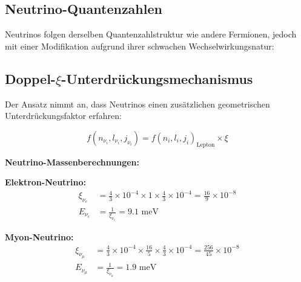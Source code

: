 \subsection{Neutrino-Quantenzahlen}
\label{subsec:neutrino_quantum_numbers}

Neutrinos folgen derselben Quantenzahlstruktur wie andere Fermionen, jedoch mit einer Modifikation aufgrund ihrer schwachen Wechselwirkungsnatur:

\begin{table}[H]
	\centering
	\caption{Neutrino-Quantenzahlen mit charakteristischer Doppel-$\xi$-Unterdrückung}
	\label{tab:neutrino_quantum_numbers}
\end{table}

\subsection{Doppel-$\xi$-Unterdrückungsmechanismus}
\label{subsec:double_xi_suppression}

Der Ansatz nimmt an, dass Neutrinos einen zusätzlichen geometrischen Unterdrückungsfaktor erfahren:

\begin{equation}
	f(n_{\nu_i}, l_{\nu_i}, j_{\nu_i}) = f(n_i, l_i, j_i)_{\text{Lepton}} \times \xi
	\label{eq:neutrino_suppression}
\end{equation}

\textbf{Neutrino-Massenberechnungen:}

\textbf{Elektron-Neutrino:}
\begin{align}
	\xi_{\nu_e} &= \frac{4}{3} \times 10^{-4} \times 1 \times \frac{4}{3} \times 10^{-4} = \frac{16}{9} \times 10^{-8} \\
	E_{\nu_e} &= \frac{1}{\xi_{\nu_e}} = 9.1 \text{ meV}
\end{align}

\textbf{Myon-Neutrino:}
\begin{align}
	\xi_{\nu_\mu} &= \frac{4}{3} \times 10^{-4} \times \frac{16}{5} \times \frac{4}{3} \times 10^{-4} = \frac{256}{45} \times 10^{-8} \\
	E_{\nu_\mu} &= \frac{1}{\xi_{\nu_\mu}} = 1.9 \text{ meV}
\end{align}

